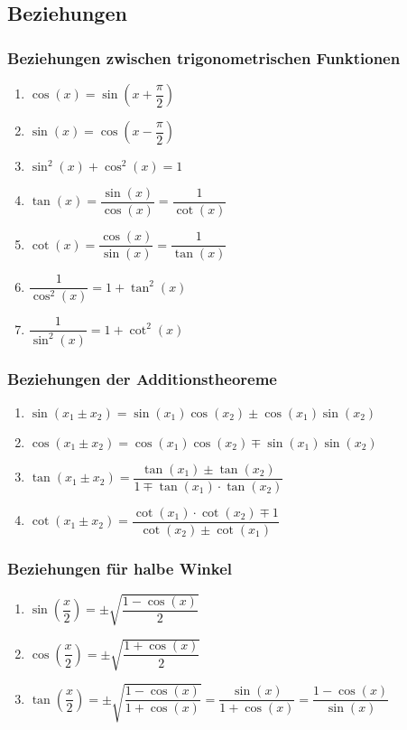 \subsection{Beziehungen}
\subsubsection{Beziehungen zwischen trigonometrischen Funktionen}
\begin{enumerate}[$(a)$]
\item $\cos\left(x\right)=\sin\left(x+\dfrac{\pi}{2}\right)$
\item $\sin\left(x\right)=\cos\left(x-\dfrac{\pi}{2}\right)$
\item $\sin^2\left(x\right)+\cos^2\left(x\right)=1$
\item $\tan\left(x\right)=\dfrac{\sin\left(x\right)}{\cos\left(x\right)}=\dfrac{1}{\cot\left(x\right)}$
\item $\cot\left(x\right)=\dfrac{\cos\left(x\right)}{\sin\left(x\right)}=\dfrac{1}{\tan\left(x\right)}$
\item $\dfrac{1}{\cos^2\left(x\right)}=1+\tan^2\left(x\right)$
\item $\dfrac{1}{\sin^2\left(x\right)}=1+\cot^2\left(x\right)$
\end{enumerate}
\subsubsection{Beziehungen der Additionstheoreme}
\begin{enumerate}[$(a)$]
\item $\sin\left(x_1\pm x_2\right)=\sin\left(x_1\right)\cos\left(x_2\right)\pm \cos\left(x_1\right)\sin\left(x_2\right)$
\item $\cos\left(x_1\pm x_2\right)=\cos\left(x_1\right)\cos\left(x_2\right)\mp \sin\left(x_1\right)\sin\left(x_2\right)$
\item $\tan\left(x_1\pm x_2\right)=\dfrac{\tan\left(x_1\right)\pm\tan\left(x_2\right)}{1\mp\tan\left(x_1\right)\cdot \tan\left(x_2\right)}$
\item $\cot\left(x_1\pm x_2\right)=\dfrac{\cot\left(x_1\right)\cdot \cot\left(x_2\right)\mp1}{\cot\left(x_2\right)\pm\cot\left(x_1\right)}$
\end{enumerate}
\subsubsection{Beziehungen für halbe Winkel}
\begin{enumerate}[$(a)$]
\item $\sin\left(\dfrac{x}{2}\right)=\pm\sqrt{\dfrac{1-\cos\left(x\right)}{2}}$
\item $\cos\left(\dfrac{x}{2}\right)=\pm\sqrt{\dfrac{1+\cos\left(x\right)}{2}}$
\item $\tan\left(\dfrac{x}{2}\right)=\pm\sqrt{\dfrac{1-\cos\left(x\right)}{1+\cos\left(x\right)}}=\dfrac{\sin\left(x\right)}{1+\cos\left(x\right)}=\dfrac{1-\cos\left(x\right)}{\sin\left(x\right)}$
\end{enumerate}

